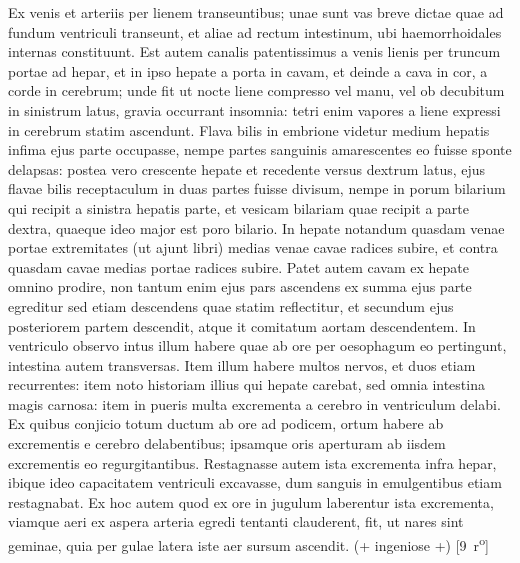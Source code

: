\pend%
\pstart%
Ex venis et arteriis per lienem transeuntibus; unae sunt vas breve dictae quae ad fundum ventriculi transeunt, et aliae ad rectum intestinum, ubi haemorrhoidales internas constituunt. Est autem canalis patentissimus a venis lienis per truncum portae ad hepar, et in ipso hepate a porta in cavam, et deinde a cava in cor, a corde in cerebrum; unde fit
\pend
\newpage
\pstart\noindent ut nocte liene compresso vel manu, vel ob decubitum in sinistrum latus, gravia occurrant insomnia: tetri enim vapores a liene expressi in cerebrum statim ascendunt.
\pend%
\pstart%
Flava bilis in embrione videtur medium hepatis infima ejus parte occupasse, nempe partes sanguinis amarescentes eo fuisse sponte delapsas: postea vero crescente hepate et recedente versus dextrum latus, ejus flavae bilis receptaculum in duas partes fuisse divisum, nempe in porum bilarium qui recipit
a sinistra hepatis parte, et vesicam bilariam quae recipit a parte dextra, quaeque ideo major est poro bilario.
\pend%
\pstart%
In hepate notandum quasdam venae portae extremitates
(ut ajunt libri) medias venae cavae radices subire, et contra quasdam cavae medias portae radices subire.
Patet autem cavam ex hepate omnino prodire, non tantum enim ejus pars ascendens ex summa ejus parte egreditur sed etiam descendens quae statim reflectitur, et secundum ejus posteriorem partem descendit, atque it comitatum aortam descendentem.
\pend%
\pstart%
In ventriculo observo intus illum habere
quae ab ore per oesophagum eo pertingunt, intestina autem transversas. Item illum habere multos nervos, et duos etiam
recurrentes: item noto historiam illius qui hepate carebat, sed omnia intestina magis carnosa: item in pueris multa excrementa a cerebro in ventriculum delabi. Ex quibus conjicio totum ductum ab ore ad podicem, ortum habere ab excrementis e cerebro delabentibus; ipsamque oris aperturam ab iisdem excrementis eo regurgitantibus. Restagnasse autem ista excrementa infra hepar, ibique ideo capacitatem ventriculi excavasse, dum sanguis in emulgentibus etiam restagnabat.
Ex hoc autem quod ex ore in jugulum laberentur ista excrementa, viamque aeri ex aspera arteria egredi tentanti clauderent, fit, ut nares sint geminae, quia per gulae latera iste aer sursum ascendit.
(+ ingeniose +)
[9~r\textsuperscript{o}]
\pend%
